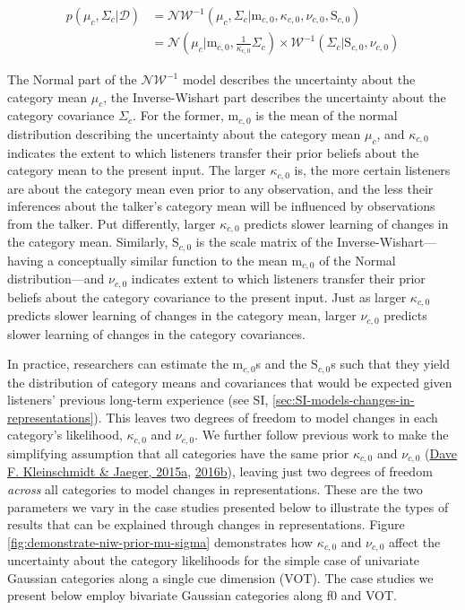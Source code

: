 \documentclass[
  11pt,
  english,
  man,floatsintext]{apa6}
\begin{document}
\begin{equation}\label{eq:niw-updating}
\begin{split}
p\left( \mu_c, \Sigma_c | \mathcal{D} \right) & = \mathcal{NW}^{-1} \left( \mu_c, \Sigma_c | \mathrm{m}_{c,0}, \kappa_{c,0}, \nu_{c,0}, \mathrm{S}_{c,0} \right) \\
& = \mathcal{N}\left( \mu_c | \mathrm{m}_{c,0}, \frac{1}{\kappa_{c,0}} \Sigma_{c} \right) \times \mathcal{W}^{-1}\left( \Sigma_c | \mathrm{S}_{c,0}, \nu_{c,0} \right)
\end{split}
\end{equation}

The Normal part of the \(\mathcal{NW^{-1}}\) model describes the uncertainty about the category mean \(\mu_c\), the Inverse-Wishart part describes the uncertainty about the category covariance \(\Sigma_c\). For the former, \(\mathrm{m}_{c,0}\) is the mean of the normal distribution describing the uncertainty about the category mean \(\mu_c\), and \(\kappa_{c,0}\) indicates the extent to which listeners transfer their prior beliefs about the category mean to the present input. The larger \(\kappa_{c,0}\) is, the more certain listeners are about the category mean even prior to any observation, and the less their inferences about the talker's category mean will be influenced by observations from the talker. Put differently, larger \(\kappa_{c,0}\) predicts slower learning of changes in the category mean. Similarly, \(\mathrm{S}_{c,0}\) is the scale matrix of the Inverse-Wishart---having a conceptually similar function to the mean \(\mathrm{m}_{c,0}\) of the Normal distribution---and \(\nu_{c,0}\) indicates extent to which listeners transfer their prior beliefs about the category covariance to the present input. Just as larger \(\kappa_{c,0}\) predicts slower learning of changes in the category mean, larger \(\nu_{c,0}\) predicts slower learning of changes in the category covariances.

In practice, researchers can estimate the \(\mathrm{m}_{c,0}\)s and the \(\mathrm{S}_{c,0}\)s such that they yield the distribution of category means and covariances that would be expected given listeners' previous long-term experience (see SI, \ref{sec:SI-models-changes-in-representations}). This leaves two degrees of freedom to model changes in each category's likelihood, \(\kappa_{c,0}\) and \(\nu_{c,0}\). We further follow previous work to make the simplifying assumption that all categories have the same prior \(\kappa_{c,0}\) and \(\nu_{c,0}\) (\protect\hyperlink{ref-kleinschmidt-jaeger2015}{Dave F. Kleinschmidt \& Jaeger, 2015a}, \protect\hyperlink{ref-kleinschmidt-jaeger2016cogsci}{2016b}), leaving just two degrees of freedom \emph{across} all categories to model changes in representations. These are the two parameters we vary in the case studies presented below to illustrate the types of results that can be explained through changes in representations. Figure \ref{fig:demonstrate-niw-prior-mu-sigma} demonstrates how \(\kappa_{c,0}\) and \(\nu_{c,0}\) affect the uncertainty about the category likelihoods for the simple case of univariate Gaussian categories along a single cue dimension (VOT). The case studies we present below employ bivariate Gaussian categories along f0 and VOT.
\end{document}
